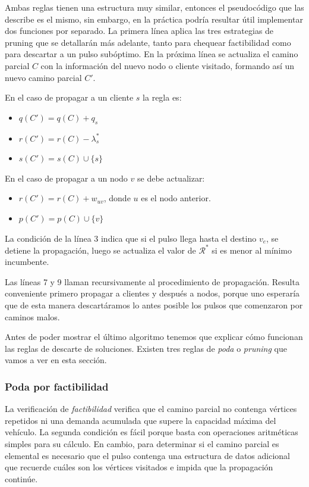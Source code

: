 Ambas reglas tienen una estructura muy similar, entonces el pseudocódigo que las describe es el mismo, sin embargo, en la práctica podría resultar útil implementar dos funciones por separado.
La primera línea aplica las tres estrategias de pruning que se detallarán más adelante, tanto para chequear factibilidad como para descartar a un pulso subóptimo.
En la próxima línea se actualiza el camino parcial $C$ con la información del nuevo nodo o cliente visitado, formando así un nuevo camino parcial $C'$.

En el caso de propagar a un cliente $s$ la regla es:
\begin{itemize}
    \item $q(C') = q(C) + q_s$
    \item $r(C') = r(C) - \lambda^{*}_s$
    \item $s(C') = s(C) \cup \{s\}$
\end{itemize}

En el caso de propagar a un nodo $v$ se debe actualizar:

\begin{itemize}
    \item $r(C') = r(C) + w_{uv}$, donde $u$ es el nodo anterior.
    \item $p(C') = p(C) \cup \{v\}$
\end{itemize}

La condición de la línea 3 indica que si el pulso llega hasta el destino $v_e$, se detiene la propagación, luego se actualiza el valor de $\mathscr{R}^{*}$ si es menor al mínimo incumbente.

Las líneas 7 y 9 llaman recursivamente al procedimiento de propagación. Resulta conveniente primero propagar a clientes y después a nodos, porque uno esperaría que de esta manera descartáramos lo antes posible los pulsos que comenzaron por caminos malos. 

Antes de poder mostrar el último algoritmo tenemos que explicar cómo funcionan las reglas de descarte de soluciones. Existen tres reglas de \emph{poda} o \emph{pruning} que vamos a ver en esta sección.

\subsubsection{Poda por factibilidad}

La verificación de \emph{factibilidad} verifica que el camino parcial no contenga vértices repetidos ni una demanda acumulada que supere la capacidad máxima del vehículo. La segunda condición es fácil porque basta con operaciones aritméticas simples para su cálculo. En cambio, para determinar si el camino parcial es elemental es necesario que el pulso contenga una estructura de datos adicional que recuerde cuáles son los vértices visitados e impida que la propagación continúe.

